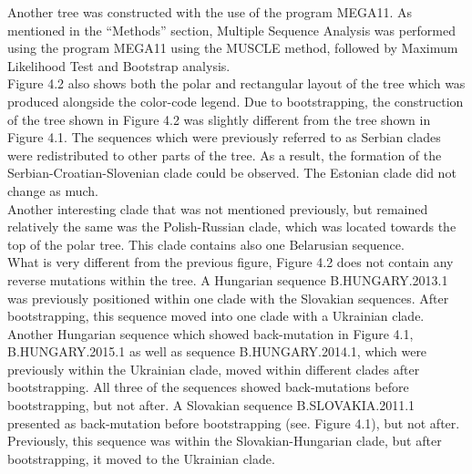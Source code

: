 Another tree was constructed with the use of the program MEGA11. 
As mentioned in the “Methods” section, Multiple Sequence Analysis was performed using the program MEGA11 using the MUSCLE method, followed by Maximum Likelihood Test and Bootstrap analysis. \\
Figure 4.2 also shows both the polar and rectangular layout of the tree which was produced alongside the color-code legend. 
Due to bootstrapping, the construction of the tree shown in Figure 4.2 was slightly different from the tree shown in Figure 4.1. 
The sequences which were previously referred to as Serbian clades were redistributed to other parts of the tree. 
As a result, the formation of the Serbian-Croatian-Slovenian clade could be observed. 
The Estonian clade did not change as much. \\
Another interesting clade that was not mentioned previously, but remained relatively the same was the Polish-Russian clade, which was located towards the top of the polar tree. 
This clade contains also one Belarusian sequence. 
\\
What is very different from the previous figure, Figure 4.2 does not contain any reverse mutations within the tree. 
A Hungarian sequence B.HUNGARY.2013.1 was previously positioned within one clade with the Slovakian sequences. 
After bootstrapping, this sequence moved into one clade with a Ukrainian clade.
Another Hungarian sequence which showed back-mutation in Figure 4.1, B.HUNGARY.2015.1 as well as sequence B.HUNGARY.2014.1, which were previously within the Ukrainian clade, moved within different clades after bootstrapping.
All three of the sequences showed back-mutations before bootstrapping, but not after. 
A Slovakian sequence B.SLOVAKIA.2011.1 presented as back-mutation before bootstrapping (see. Figure 4.1), but not after. 
Previously, this sequence was within the Slovakian-Hungarian clade, but after bootstrapping, it moved to the Ukrainian clade.



